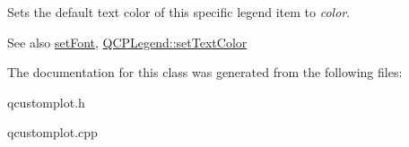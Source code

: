 Sets the default text color of this specific legend item to {\itshape color}.

\begin{DoxySeeAlso}{See also}
\hyperlink{classQCPAbstractLegendItem_a409c53455d8112f71d70c0c43eb10265}{set\+Font}, \hyperlink{classQCPLegend_ae1eb239ff4a4632fe1b6c3e668d845c6}{Q\+C\+P\+Legend\+::set\+Text\+Color} 
\end{DoxySeeAlso}


The documentation for this class was generated from the following files\+:\begin{DoxyCompactItemize}
\item 
qcustomplot.\+h\item 
qcustomplot.\+cpp\end{DoxyCompactItemize}

